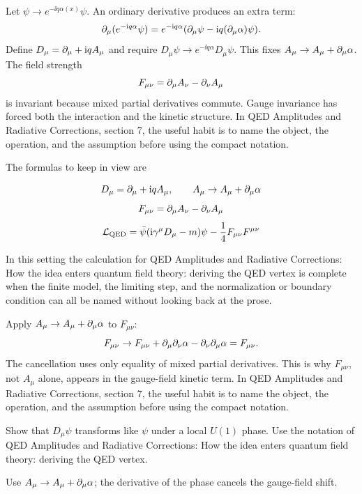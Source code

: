 Let \(\psi\to e^{-\ii q\alpha(x)}\psi\).  An ordinary derivative produces an extra term:
\[
  \partial_\mu(e^{-\mathrm i q\alpha}\psi)
  =
  e^{-\mathrm i q\alpha}(\partial_\mu\psi-\mathrm i q(\partial_\mu\alpha)\psi).
\]
Define \(D_\mu=\partial_\mu+\mathrm i qA_\mu\) and require \(D_\mu\psi\to e^{-\ii q\alpha}D_\mu\psi\).  This fixes \(A_\mu\to A_\mu+\partial_\mu\alpha\).  The field strength
\[
  F_{\mu\nu}=\partial_\mu A_\nu-\partial_\nu A_\mu
\]
is invariant because mixed partial derivatives commute.  Gauge invariance has forced both the interaction and the kinetic structure.  In QED Amplitudes and Radiative Corrections, section 7, the useful habit is to name the object, the operation, and the assumption before using the compact notation.

The formulas to keep in view are

\[
  D_\mu=\partial_\mu+\mathrm i qA_\mu,\qquad A_\mu\to A_\mu+\partial_\mu\alpha
\]
\[
  F_{\mu\nu}=\partial_\mu A_\nu-\partial_\nu A_\mu
\]
\[
  \mathcal L_{\mathrm{QED}}=\bar\psi(\mathrm i\gamma^\mu D_\mu-m)\psi-\frac14F_{\mu\nu}F^{\mu\nu}
\]

In this setting the calculation for QED Amplitudes and Radiative Corrections: How the idea enters quantum field theory: deriving the QED vertex is complete when the finite model, the limiting step, and the normalization or boundary condition can all be named without looking back at the prose.




\begin{example}
Apply \(A_\mu\to A_\mu+\partial_\mu\alpha\) to \(F_{\mu\nu}\):
\[
  F_{\mu\nu}\to F_{\mu\nu}+\partial_\mu\partial_\nu\alpha-\partial_\nu\partial_\mu\alpha=F_{\mu\nu}.
\]
The cancellation uses only equality of mixed partial derivatives.  This is why \(F_{\mu\nu}\), not \(A_\mu\) alone, appears in the gauge-field kinetic term.  In QED Amplitudes and Radiative Corrections, section 7, the useful habit is to name the object, the operation, and the assumption before using the compact notation.
\end{example}



\begin{exercise}
Show that \(D_\mu\psi\) transforms like \(\psi\) under a local \(U(1)\) phase.  Use the notation of QED Amplitudes and Radiative Corrections: How the idea enters quantum field theory: deriving the QED vertex.
\begin{answer}
Use \(A_\mu\to A_\mu+\partial_\mu\alpha\); the derivative of the phase cancels the gauge-field shift.
\end{answer}
\end{exercise}


